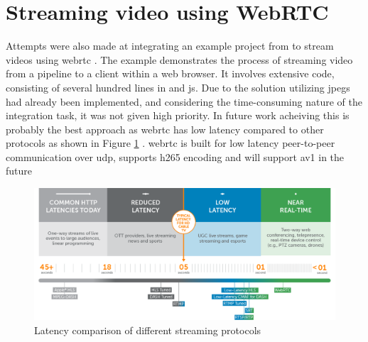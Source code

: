 \section{Streaming video using WebRTC}
Attempts were also made at integrating an example project from \gs  to stream videos using \gls{webrtc} \cite{gstreamerWebrtcMasterGStreamer2021}.
The example demonstrates the process of streaming video from a pipeline to a client within a web browser. It involves extensive code, consisting of several hundred lines in \py and \gls{js}.
Due to the solution utilizing \glspl{jpeg} had already been implemented, and considering the time-consuming nature of the integration task, it was not given high priority.
In future work acheiving this is probably the best approach as \gls{webrtc} has low latency compared to other protocols as shown in Figure \ref{fig:streaming_latency} \cite{doughertyUltraLowLatency2022}.
\gls{webrtc} is built for low latency peer-to-peer communication over \gls{udp}, supports \gls{h265} encoding and will support \gls{av1} in the future \cite[1]{loretoRealTimeCommunicationWebRTC2014} \cite{ablyWebRTCVsWebSocket2023} \cite{mekyaFirstHEVC2652020}
\cite{red5proKeyReasonsAV12023}
\begin{figure}[H]
    \centering
    \includegraphics[width=\textwidth]{figures/webrtc_latency.png}
    \caption{Latency comparison of different streaming protocols \cite{doughertyUltraLowLatency2022}}
    \label{fig:streaming_latency}
\end{figure}